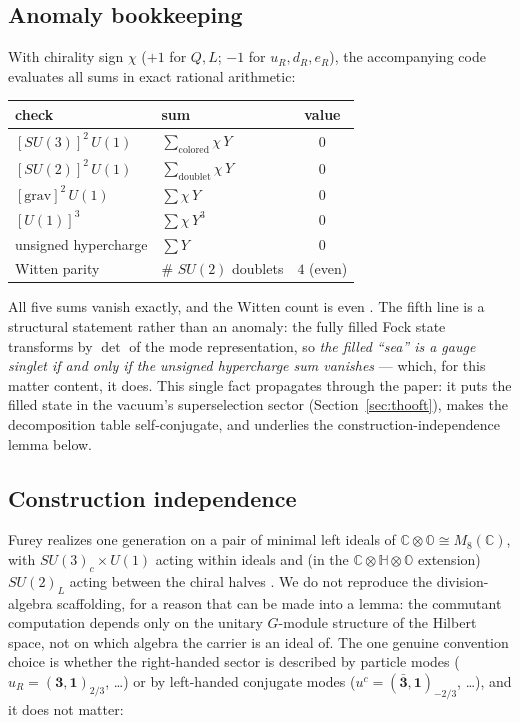 \documentclass[11pt]{article}
\newcommand{\CC}{\mathbb{C}}
\newcommand{\rep}[2]{(\mathbf{#1})_{#2}}
\begin{document}
\subsection{Anomaly bookkeeping}\label{sec:anomalies}

With chirality sign $\chi$ ($+1$ for $Q, L$; $-1$ for $u_R, d_R, e_R$), the accompanying code evaluates all sums in exact rational arithmetic:
\begin{center}
\small
\begin{tabular}{llc}
\toprule
check & sum & value \\
\midrule
$[SU(3)]^2\,U(1)$ & $\sum_{\mathrm{colored}} \chi\, Y$ & $0$ \\
$[SU(2)]^2\,U(1)$ & $\sum_{\mathrm{doublet}} \chi\, Y$ & $0$ \\
$[\mathrm{grav}]^2\,U(1)$ & $\sum \chi\, Y$ & $0$ \\
$[U(1)]^3$ & $\sum \chi\, Y^3$ & $0$ \\
unsigned hypercharge & $\sum Y$ & $0$ \\
Witten parity & \# $SU(2)$ doublets & $4$ (even) \\
\bottomrule
\end{tabular}
\end{center}
All five sums vanish exactly, and the Witten count is even \cite{witten}. The fifth line is a structural statement rather than an anomaly: the fully filled Fock state transforms by $\det$ of the mode representation, so \emph{the filled ``sea'' is a gauge singlet if and only if the unsigned hypercharge sum vanishes} --- which, for this matter content, it does. This single fact propagates through the paper: it puts the filled state in the vacuum's superselection sector (Section~\ref{sec:thooft}), makes the decomposition table self-conjugate, and underlies the construction-independence lemma below.

\subsection{Construction independence}\label{sec:conventions}

Furey realizes one generation on a pair of minimal left ideals of $\CC\otimes\mathbb{O} \cong M_8(\CC)$, with $SU(3)_c\times U(1)$ acting within ideals and (in the $\CC\otimes\mathbb{H}\otimes\mathbb{O}$ extension) $SU(2)_L$ acting between the chiral halves \cite{furey14,furey16,furey18}. We do not reproduce the division-algebra scaffolding, for a reason that can be made into a lemma: the commutant computation depends only on the unitary $G$-module structure of the Hilbert space, not on which algebra the carrier is an ideal of. The one genuine convention choice is whether the right-handed sector is described by particle modes ($u_R = \rep{3,1}{2/3}$, \ldots) or by left-handed conjugate modes ($u^c = (\bar{\mathbf{3}},\mathbf{1})_{-2/3}$, \ldots), and it does not matter:
\end{document}
